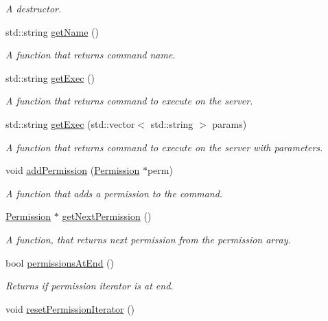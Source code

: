 \begin{DoxyCompactItemize}
\begin{DoxyCompactList}\small\item\em A destructor. \end{DoxyCompactList}\item 
std\+::string \hyperlink{class_r_c_f_1_1_server_1_1_command_acb05b4f4e0ba511dce1e63464ae16beb}{get\+Name} ()
\begin{DoxyCompactList}\small\item\em A function that returns command name. \end{DoxyCompactList}\item 
std\+::string \hyperlink{class_r_c_f_1_1_server_1_1_command_ac7bcfc6e3f170795d396e1a164db6a52}{get\+Exec} ()
\begin{DoxyCompactList}\small\item\em A function that returns command to execute on the server. \end{DoxyCompactList}\item 
std\+::string \hyperlink{class_r_c_f_1_1_server_1_1_command_a2c1c0f9dfe3a3d017b1a8b6379432948}{get\+Exec} (std\+::vector$<$ std\+::string $>$ params)
\begin{DoxyCompactList}\small\item\em A function that returns command to execute on the server with parameters. \end{DoxyCompactList}\item 
void \hyperlink{class_r_c_f_1_1_server_1_1_command_a6c1f10205090210bf56ed2e1827a1f30}{add\+Permission} (\hyperlink{class_r_c_f_1_1_server_1_1_permission}{Permission} $\ast$perm)
\begin{DoxyCompactList}\small\item\em A function that adds a permission to the command. \end{DoxyCompactList}\item 
\hyperlink{class_r_c_f_1_1_server_1_1_permission}{Permission} $\ast$ \hyperlink{class_r_c_f_1_1_server_1_1_command_a1c01f63f343f45221ff8a59499397a50}{get\+Next\+Permission} ()
\begin{DoxyCompactList}\small\item\em A function, that returns next permission from the permission array. \end{DoxyCompactList}\item 
bool \hyperlink{class_r_c_f_1_1_server_1_1_command_a93e8c44b1bfc3e5fd216d59b8ec69774}{permissions\+At\+End} ()
\begin{DoxyCompactList}\small\item\em Returns if permission iterator is at end. \end{DoxyCompactList}\item 
\hypertarget{class_r_c_f_1_1_server_1_1_command_a79b6dad2cd8d5ad5ef6753d62af9cf8f}{}void \hyperlink{class_r_c_f_1_1_server_1_1_command_a79b6dad2cd8d5ad5ef6753d62af9cf8f}{reset\+Permission\+Iterator} ()\label{class_r_c_f_1_1_server_1_1_command_a79b6dad2cd8d5ad5ef6753d62af9cf8f}


\end{DoxyCompactItemize}
